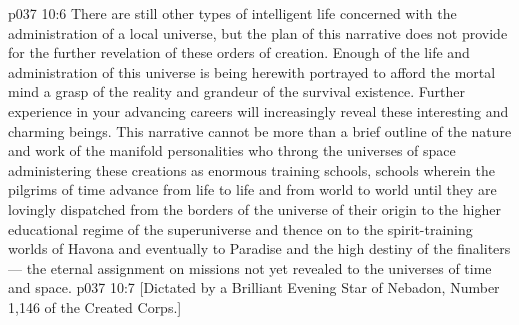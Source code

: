 \vs p037 10:6 There are still other types of intelligent life concerned with the administration of a local universe, but the plan of this narrative does not provide for the further revelation of these orders of creation. Enough of the life and administration of this universe is being herewith portrayed to afford the mortal mind a grasp of the reality and grandeur of the survival existence. Further experience in your advancing careers will increasingly reveal these interesting and charming beings. This narrative cannot be more than a brief outline of the nature and work of the manifold personalities who throng the universes of space administering these creations as enormous training schools, schools wherein the pilgrims of time advance from life to life and from world to world until they are lovingly dispatched from the borders of the universe of their origin to the higher educational regime of the superuniverse and thence on to the spirit\hyp{}training worlds of Havona and eventually to Paradise and the high destiny of the finaliters --- the eternal assignment on missions not yet revealed to the universes of time and space.
\vsetoff
\vs p037 10:7 [Dictated by a Brilliant Evening Star of Nebadon, Number 1,146 of the Created Corps.]
\quizlink
